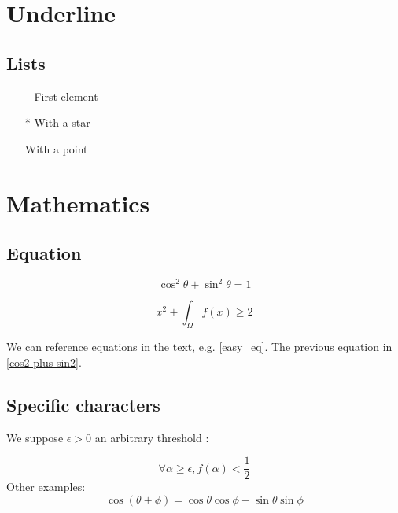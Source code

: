 \documentclass{article}
\begin{document}
\section{Underline}

\subsection{Lists}

\begin{itemize}
\item[–] First element
\item[*] With a star
\item[\textbullet] With a point 
\end{itemize}


\section{Mathematics}

\subsection{Equation}

\begin{equation} \label{cos2 plus sin2}
\cos^2\theta  + \sin^2\theta = 1
\end{equation}


\begin{equation} \label{easy_eq}
x^2+\int_{\Omega} f(x) \geq 2
\end{equation}

We can reference equations in the text, e.g. \eqref{easy_eq}.
The previous equation in \eqref{cos2 plus sin2}.


\subsection{Specific characters}

We suppose $\epsilon > 0$ an arbitrary threshold :

\[
\forall \alpha \geq \epsilon,
f(\alpha) < \frac{1}{2}
\]
Other examples: \\ 
\[
\cos(\theta+\phi)=\cos\theta\cos \phi−\sin\theta\sin\phi
\]

\end{document}

